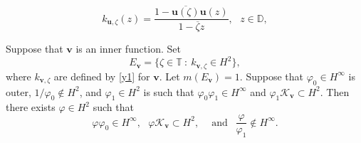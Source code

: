 \documentclass[10pt,a4paper]{amsart}
\begin{document}
\begin{equation}
\label{y1}
k_{{\mathbf u},\zeta}(z)=\frac{1-\overline{{\mathbf u}(\zeta)}{\mathbf u}(z)}{1-\overline\zeta z},\ \ \ z\in\mathbb D,  
\end{equation}

\begin{lemma}\label{lemssmain} Suppose that $\mathbf v$ is an inner function. Set  
\begin{equation}\label{eev} E_{\mathbf v}=\{\zeta\in\mathbb T\ : \ k_{\mathbf v,\zeta}\in H^2\},
\end{equation}
where $k_{\mathbf v,\zeta}$ are defined by \eqref{y1} for $\mathbf v$. 
Let $m(E_{\mathbf v})=1$. Suppose that $\varphi_0\in H^\infty$ is outer, 
 $1/\varphi_0\not\in H^2$,
 and $\varphi_1\in H^2$ is such that $\varphi_0\varphi_1\in H^\infty$ and 
$\varphi_1\mathcal K_{\mathbf v}\subset H^2$.
Then there exists $\varphi\in H^2$ such that 
$$\varphi\varphi_0\in H^\infty, \ \ \ \varphi\mathcal K_{\mathbf v}\subset H^2, \ \ \ 
 \ \text{ and } \ \ \frac{\varphi}{\varphi_1}\not\in H^\infty.$$
\end{lemma}
\end{document}
